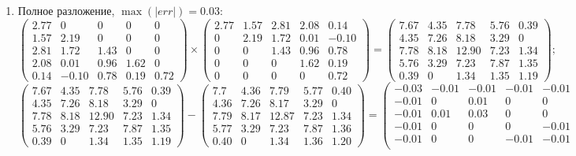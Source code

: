 \begin{enumerate}
    \item Полное разложение, $\max(|err|) = 0.03$:
    $$\begin{pmatrix}
        2.77&  0   & 0   & 0   & 0\\
        1.57&  2.19& 0   & 0   & 0\\
        2.81&  1.72& 1.43& 0   & 0\\
        2.08&  0.01& 0.96& 1.62& 0\\
        0.14& -0.10& 0.78& 0.19& 0.72
    \end{pmatrix} \times
    \begin{pmatrix}
        2.77&  1.57&  2.81&  2.08&   0.14\\
        0   &  2.19&  1.72&  0.01&  -0.10\\
        0   &  0   &  1.43&  0.96&   0.78\\
        0   &  0   &  0   &  1.62&   0.19\\
        0   &  0   &  0   &  0   &   0.72
    \end{pmatrix} =
    \begin{pmatrix}
        7.67&  4.35&  7.78& 5.76& 0.39\\
        4.35&  7.26&  8.18& 3.29& 0\\
        7.78&  8.18& 12.90& 7.23& 1.34\\
        5.76&  3.29&  7.23& 7.87& 1.35\\
        0.39&  0 &  1.34& 1.35& 1.19
    \end{pmatrix};$$
    $$\begin{pmatrix}
        7.67&  4.35&  7.78& 5.76& 0.39\\
        4.35&  7.26&  8.18& 3.29& 0\\
        7.78&  8.18& 12.90& 7.23& 1.34\\
        5.76&  3.29&  7.23& 7.87& 1.35\\
        0.39&  0 &  1.34& 1.35& 1.19
    \end{pmatrix} -
    \begin{pmatrix}
        7.7  & 4.36 & 7.79  & 5.77 & 0.40 \\
        4.36 & 7.26 & 8.17  & 3.29 & 0    \\
        7.79 & 8.17 & 12.87 & 7.23 & 1.34 \\
        5.77 & 3.29 & 7.23  & 7.87 & 1.36 \\
        0.40 & 0    & 1.34  & 1.36 & 1.20
    \end{pmatrix} =
    \begin{pmatrix}
        -0.03& -0.01& -0.01& -0.01& -0.01\\
        -0.01&  0 &  0.01& 0 &  0\\
        -0.01&  0.01&  0.03&  0 & 0\\
        -0.01&  0 &  0 &  0 & -0.01\\
        -0.01&  0 & 0 & -0.01& -0.01\\
    \end{pmatrix};$$


\end{enumerate}
